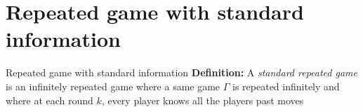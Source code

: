 \section{Repeated game with standard information}
\begin{frame}{Repeated game with standard information}
\textbf{Definition:} A \textit{standard repeated game} is an infinitely repeated game where a same game $\Gamma$ is repeated infinitely and where at each round $k$, every player knows all the players past moves
\end{frame}